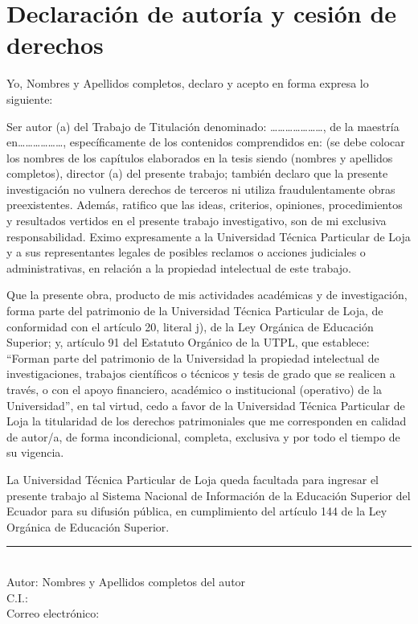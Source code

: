 \chapter*{Declaración de autoría y cesión de derechos}

Yo, Nombres y Apellidos completos, declaro y acepto en forma expresa lo siguiente:

\vspace{0.5cm}

Ser autor (a) del Trabajo de Titulación denominado: \ldots\ldots\ldots\ldots\ldots\ldots\ldots, de la maestría en\ldots\ldots\ldots\ldots\ldots\ldots, específicamente de los contenidos comprendidos en: (se debe colocar los nombres de los capítulos elaborados en la tesis siendo (nombres y apellidos completos), director (a) del presente trabajo; también declaro que la presente investigación no vulnera derechos de terceros ni utiliza fraudulentamente obras preexistentes. Además, ratifico que las ideas, criterios, opiniones, procedimientos y resultados vertidos en el presente trabajo investigativo, son de mi exclusiva responsabilidad. Eximo expresamente a la Universidad Técnica Particular de Loja y a sus representantes legales de posibles reclamos o acciones judiciales o administrativas, en relación a la propiedad intelectual de este trabajo.

\vspace{0.5cm}

Que la presente obra, producto de mis actividades académicas y de investigación, forma parte del patrimonio de la Universidad Técnica Particular de Loja, de conformidad con el artículo 20, literal j), de la Ley Orgánica de Educación Superior; y, artículo 91 del Estatuto Orgánico de la UTPL, que establece: ``Forman parte del patrimonio de la Universidad la propiedad intelectual de investigaciones, trabajos científicos o técnicos y tesis de grado que se realicen a través, o con el apoyo financiero, académico o institucional (operativo) de la Universidad'', en tal virtud, cedo a favor de la Universidad Técnica Particular de Loja la titularidad de los derechos patrimoniales que me corresponden en calidad de autor/a, de forma incondicional, completa, exclusiva y por todo el tiempo de su vigencia.

\vspace{0.5cm}

La Universidad Técnica Particular de Loja queda facultada para ingresar el presente trabajo al Sistema Nacional de Información de la Educación Superior del Ecuador para su difusión pública, en cumplimiento del artículo 144 de la Ley Orgánica de Educación Superior.

\vspace{3cm}

\noindent
\rule{10cm}{0.4pt}\\
Autor: Nombres y Apellidos completos del autor\\
C.I.:\\
Correo electrónico: